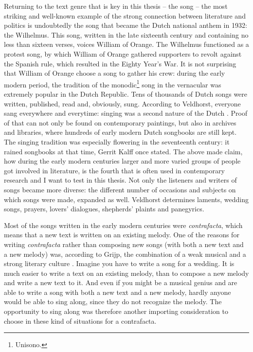 Returning to the text genre that is key in this thesis -- the song -- the most striking and well-known example of the strong connection between literature and politics is undoubtedly the song that became the Dutch national anthem in 1932: the Wilhelmus. This song, written in the late sixteenth century and containing no less than sixteen verses, voices William of Orange. The Wilhelmus functioned as a protest song, by which William of Orange gathered supporters to revolt against the Spanish rule, which resulted in the Eighty Year's War. It is not surprising that William of Orange choose a song to gather his crew: during the early modern period, the tradition of the monodic\footnote{Unisono.} song in the vernacular was extremely popular in the Dutch Republic. Tens of thousands of Dutch songs were written, published, read and, obviously, sung. According to Veldhorst, everyone sang everywhere and everytime: singing was a second nature of the Dutch \autocite[12]{veldhorst_zingend_2009}. Proof of that can not only be found on contemporary paintings, but also in archives and libraries, where hundreds of early modern Dutch songbooks are still kept. The singing tradition was especially flowering in the seventeenth century: it rained songbooks at that time, Gerrit Kalff once stated.\autocite[666]{kalff_het_1884} The above made claim, how during the early modern centuries larger and more varied groups of people got involved in literature, is the fourth that is often used in contemporary research and I want to test in this thesis. Not only the listeners and writers of songs became more diverse: the different number of occasions and subjects on which songs were made, expanded as well. Veldhorst determines laments, wedding songs, prayers, lovers' dialogues, shepherds' plaints and panegyrics. \autocite[224]{veldhorst_pharmacy_2008}

Most of the songs written in the early modern centuries were \textit{contrafacta}, which means that a new text is written on an existing melody. One of the reasons for writing \textit{contrafacta} rather than composing new songs (with both a new text and a new melody) was, according to Grijp, the combination of a weak musical and a strong literary culture \autocite[23, 24]{grijp_het_1991}. Imagine you have to write a song for a wedding. It is much easier to write a text on an existing melody, than to compose a new melody and write a new text to it. And even if you might be a musical genius and are able to write a song with both a new text and a new melody, hardly anyone would be able to sing along, since they do not recognize the melody. The opportunity to sing along was therefore another importing consideration to choose in these kind of situations for a contrafacta.

